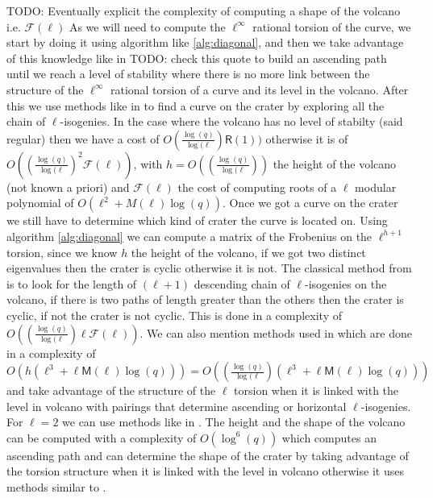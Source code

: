 \documentclass{lms}
\newcommand{\todo}[1]{{\color{red}TODO: #1}}
\begin{document}
\todo{Eventually explicit the complexity of computing a shape of the volcano i.e. $\mathcal{F}(\ell)$}
As we will need to compute the $\ell^{\infty}$ rational torsion of the curve, we start by doing it using algorithm like \ref{alg:diagonal}, and then we take advantage of this knowledge like in \cite{MireMRV05} \todo{check this quote} to build an ascending path until we reach a level of stability where there is no more link between the structure of the $\ell^{\infty}$ rational torsion of a curve and its level in the volcano. After this we use methods like in \cite{volcano} to find a curve on the crater by exploring all the chain of $\ell$-isogenies. In the case where the volcano has no level of stabilty (said regular) then we have a cost of $O(\frac{\log(q)}{\log(\ell}) \mathsf{R}(1) )$ otherwise it is of  $O( ( \frac{\log(q)}{\log(\ell})^2 \mathcal{F}(\ell) )$, with $h=O(( \frac{\log(q)}{\log(\ell}))$ the height of the volcano (not known a priori) and $\mathcal{F}(\ell)$ the cost of computing roots of a $\ell$ modular polynomial of $O(\ell^2+M(\ell)\log(q))$. 
\newline
Once we got a curve on the crater we still have to determine which kind of crater the curve is located on. Using algorithm \ref{alg:diagonal} we can compute a matrix of the Frobenius on the $\ell^{h+1}$ torsion, since we know $h$ the height of the volcano, if we got two distinct eigenvalues then the crater is cyclic otherwise it is not. The classical method from \cite{volcano} is to look for  the length of $(\ell+1)$ descending chain of $\ell$-isogenies on the volcano, if there is two paths of length greater than the others then the crater is cyclic, if not the crater is not cyclic. This is done in a complexity of $O( ( \frac{\log(q)}{\log(\ell})\ell \mathcal{F}(\ell) )$. We can also mention methods used in \cite{IonicaJ10} which are done in a complexity of $O(h(\ell^3+\ell \mathsf{M}(\ell) \log(q)))=O(( \frac{\log(q)}{\log(\ell})(\ell^3+\ell \mathsf{M}(\ell) \log(q)))$ and take advantage of the structure of the $\ell$ torsion when it is linked with the level in volcano with pairings that determine ascending or horizontal $\ell$-isogenies. %
\newline 
For $\ell=2$ we can use methods like in \cite{MiretMRV05}. The height and the shape of the volcano can be computed with a complexity of $O(\log^6(q))$ which computes an ascending path and can determine the shape of the crater by taking advantage of the torsion structure when it is linked with the level in volcano otherwise it uses methods similar to \cite{volcano}.
  
\end{document}
